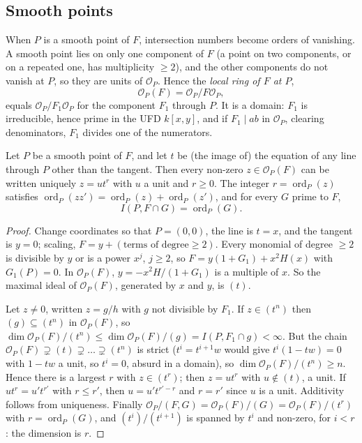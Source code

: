 \subsection*{Smooth points}

When $P$ is a smooth point of $F$, intersection numbers become orders of vanishing. A smooth point lies on only one component of $F$
(a point on two components, or on a repeated one, has multiplicity $\ge2$), and the other components do not vanish at $P$, so they are units of
$\mathcal O_P$. Hence the \emph{local ring of $F$ at $P$},
\[
\mathcal O_P(F)=\mathcal O_P/F\mathcal O_P,
\]
equals $\mathcal O_P/F_1\mathcal O_P$ for the component $F_1$ through $P$. It is a domain: $F_1$ is irreducible, hence prime in the UFD
$k[x,y]$, and if $F_1\mid ab$ in $\mathcal O_P$, clearing denominators, $F_1$ divides one of the numerators.

\begin{proposition}\label{prop:smoothdvr}
Let $P$ be a smooth point of $F$, and let $t$ be (the image of) the equation of any line through $P$ other than the tangent. Then every
non-zero $z\in\mathcal O_P(F)$ can be written uniquely $z=ut^r$ with $u$ a unit and $r\ge0$. The integer $r=\operatorname{ord}_P(z)$ satisfies
$\operatorname{ord}_P(zz')=\operatorname{ord}_P(z)+\operatorname{ord}_P(z')$, and for every $G$ prime to $F$,
\[
I(P,F\cap G)=\operatorname{ord}_P(G).
\]
\end{proposition}
\begin{proof}
Change coordinates so that $P=(0,0)$, the line is $t=x$, and the tangent is $y=0$; scaling, $F=y+(\text{terms of degree}\ge2)$. Every monomial of
degree $\ge2$ is divisible by $y$ or is a power $x^j$, $j\ge2$, so $F=y(1+G_1)+x^2H(x)$ with $G_1(P)=0$. In $\mathcal O_P(F)$, $y=-x^2H/(1+G_1)$ is a
multiple of $x$. So the maximal ideal of $\mathcal O_P(F)$, generated by $x$ and $y$, is $(t)$.

Let $z\ne0$, written $z=g/h$ with $g$ not divisible by $F_1$. If $z\in(t^n)$ then $(g)\subseteq(t^n)$ in $\mathcal O_P(F)$, so
$\dim\mathcal O_P(F)/(t^n)\le\dim\mathcal O_P(F)/(g)=I(P,F_1\cap g)<\infty$. But the chain $\mathcal O_P(F)\supsetneq(t)\supsetneq\dots\supsetneq(t^n)$ is
strict ($t^i=t^{i+1}w$ would give $t^i(1-tw)=0$ with $1-tw$ a unit, so $t^i=0$, absurd in a domain), so $\dim\mathcal O_P(F)/(t^n)\ge n$. Hence
there is a largest $r$ with $z\in(t^r)$; then $z=ut^r$ with $u\notin(t)$, a unit. If $ut^r=u't^{r'}$ with $r\le r'$, then $u=u't^{r'-r}$ and
$r=r'$ since $u$ is a unit. Additivity follows from uniqueness. Finally $\mathcal O_P/(F,G)=\mathcal O_P(F)/(G)=\mathcal O_P(F)/(t^r)$ with
$r=\operatorname{ord}_P(G)$, and $(t^i)/(t^{i+1})$ is spanned by $t^i$ and non-zero, for $i<r$: the dimension is $r$.
\end{proof}

